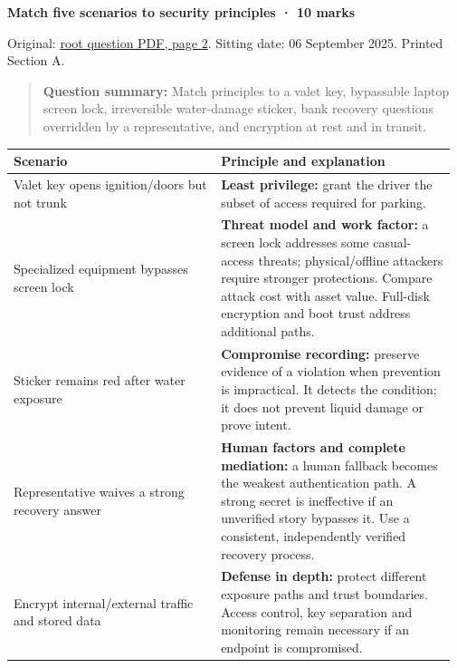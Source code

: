 \documentclass[11pt,a4paper]{article}
\begin{document}
\textbf{Match five scenarios to security principles · 10 marks}


Original: \href{../../CSE405-Security_Merged.pdf\#page=2}{root question PDF,\allowbreak{} page 2}. Sitting date: 06 September 2025. Printed Section A.



\begin{quote}\small

\textbf{Question summary:} Match principles to a valet key,\allowbreak{} bypassable laptop screen lock,\allowbreak{} irreversible water-damage sticker,\allowbreak{} bank recovery questions overridden by a representative,\allowbreak{} and encryption at rest and in transit.



\end{quote}


{\small\setlength{\tabcolsep}{3pt}
\begin{longtable}{>{\raggedright\arraybackslash}p{0.45121\linewidth}>{\raggedright\arraybackslash}p{0.51968\linewidth}}
\toprule
\textbf{Scenario} & \textbf{Principle and explanation} \\
\midrule
\endhead
Valet key opens ignition/\allowbreak{}doors but not trunk & \textbf{Least privilege:} grant the driver the subset of access required for parking. \\
Specialized equipment bypasses screen lock & \textbf{Threat model and work factor:} a screen lock addresses some casual-access threats; physical/\allowbreak{}offline attackers require stronger protections. Compare attack cost with asset value. Full-disk encryption and boot trust address additional paths. \\
Sticker remains red after water exposure & \textbf{Compromise recording:} preserve evidence of a violation when prevention is impractical. It detects the condition; it does not prevent liquid damage or prove intent. \\
Representative waives a strong recovery answer & \textbf{Human factors and complete mediation:} a human fallback becomes the weakest authentication path. A strong secret is ineffective if an unverified story bypasses it. Use a consistent,\allowbreak{} independently verified recovery process. \\
Encrypt internal/\allowbreak{}external traffic and stored data & \textbf{Defense in depth:} protect different exposure paths and trust boundaries. Access control,\allowbreak{} key separation and monitoring remain necessary if an endpoint is compromised. \\
\bottomrule
\end{longtable}
}
\end{document}
